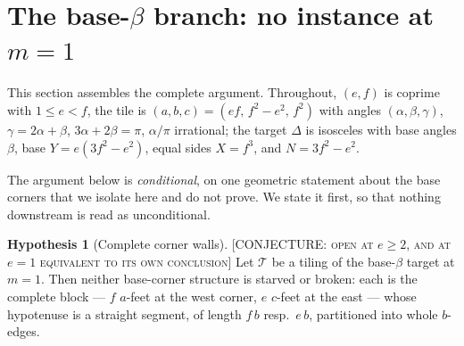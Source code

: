 \documentclass[11pt,reqno]{amsart}
\theoremstyle{plain}
\theoremstyle{definition}
\newtheorem{hypothesis}[theorem]{Hypothesis}
\newcommand{\lab}[1]{\hfill\textnormal{\footnotesize\textsc{[#1]}}}
\begin{document}
\section{The base-$\beta$ branch: no instance at $m=1$}\label{sec:compfull}

This section assembles the complete argument. Throughout, $(e,f)$ is coprime with $1\le e<f$, the
tile is $(a,b,c)=(ef,\,f^2-e^2,\,f^2)$ with angles $(\alpha,\beta,\gamma)$, $\gamma=2\alpha+\beta$,
$3\alpha+2\beta=\pi$, $\alpha/\pi$ irrational; the target $\Delta$ is isosceles with base angles
$\beta$, base $Y=e(3f^2-e^2)$, equal sides $X=f^3$, and $N=3f^2-e^2$.

The argument below is \emph{conditional}, on one geometric statement about the base corners that we
isolate here and do not prove. We state it first, so that nothing downstream is read as
unconditional.

\begin{hypothesis}[Complete corner walls]\label{hyp:walls}\lab{CONJECTURE: open at $e\ge2$, and at $e=1$ equivalent to its own conclusion}
Let $\mathcal T$ be a tiling of the base-$\beta$ target at $m=1$. Then neither base-corner structure
is starved or broken: each is the complete block --- $f$ $a$-feet at the west corner, $e$ $c$-feet at
the east --- whose hypotenuse is a straight segment, of length $f\,b$ resp.\ $e\,b$, partitioned into
whole $b$-edges.
\end{hypothesis}
\end{document}
